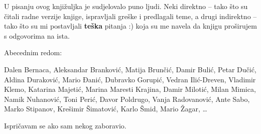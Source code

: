 
U pisanju ovog knjižuljka je sudjelovalo puno ljudi.
Neki direktno -- tako što su čitali radne verzije knjige, ispravljali greške i predlagali teme, a drugi indirektno -- tako što su mi postavljali \textbf{teška} pitanja :) koja su me navela da knjigu proširujem s odgovorima na ista.

Abecednim redom:

Dalen Bernaca,
Aleksandar Branković,
Matija Brunčić,
Damir Bulić,
Petar Dučić,
Aldina Duraković,
Mario Đanić,
Dubravko Gorupić,
Vedran Ilić-Dreven,
Vladimir Klemo,
Katarina Majetić,
Marina Maresti Krajina,
Damir Milotić, 
Milan Mimica,
Namik Nuhanović,
Toni Perić,
Davor Poldrugo,
Vanja Radovanović,
Ante Sabo,
Marko Stipanov,
Krešimir Šimatović,
Karlo Šmid,
Mario Žagar,
\dots

Ispričavam se ako sam nekog zaboravio.
